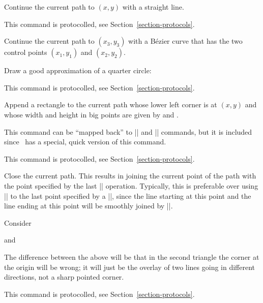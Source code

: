 \begin{command}{\pgfsys@lineto{}}
    Continue the current path to $(x,y)$ with a straight line.

    This command is protocolled, see Section~\ref{section-protocols}.
\end{command}

\begin{command}{\pgfsys@curveto{}}
    Continue the current path to $(x_3,y_3)$ with a Bézier curve that has the
    two control points  $(x_1,y_1)$ and  $(x_2,y_2)$.

    \example Draw a good approximation of a quarter circle:
\begin{codeexample}
\pgfsys@moveto{10pt}{0pt}
\pgfsys@curveto{10pt}{5.55pt}{5.55pt}{10pt}{0pt}{10pt}
\pgfsys@stroke
\end{codeexample}

    This command is protocolled, see Section~\ref{section-protocols}.
\end{command}

\begin{command}{\pgfsys@rect{}}
    Append a rectangle to the current path whose lower left corner is at
    $(x,y)$ and whose width and height in big points are  given by 
    and .

    This command can be ``mapped back'' to |\pgfsys@moveto| and
    |\pgfsys@lineto| commands, but it is included since \pdf\ has a special,
    quick version of this command.

    This command is protocolled, see Section~\ref{section-protocols}.
\end{command}

\begin{command}{\pgfsys@closepath}
    Close the current path. This results in joining the current point of the
    path with the point specified by the last |\pgfsys@moveto| operation.
    Typically, this is preferable over using |\pgfsys@lineto| to the last point
    specified by a |\pgfsys@moveto|, since the line starting at this point and
    the line ending at this point will be smoothly joined by
    |\pgfsys@closepath|.

    \example Consider
\begin{codeexample}
\pgfsys@moveto{0pt}{0pt}
\pgfsys@lineto{10bp}{10bp}
\pgfsys@lineto{0bp}{10bp}
\pgfsys@closepath
\pgfsys@stroke
\end{codeexample}
    and
\begin{codeexample}
\pgfsys@moveto{0bp}{0bp}
\pgfsys@lineto{10bp}{10bp}
\pgfsys@lineto{0bp}{10bp}
\pgfsys@lineto{0bp}{0bp}
\pgfsys@stroke
\end{codeexample}

    The difference between the above will be that in the second triangle the
    corner at the origin will be wrong; it will just be the overlay of two
    lines going in different directions, not a sharp pointed corner.

    This command is protocolled, see Section~\ref{section-protocols}.
\end{command}



